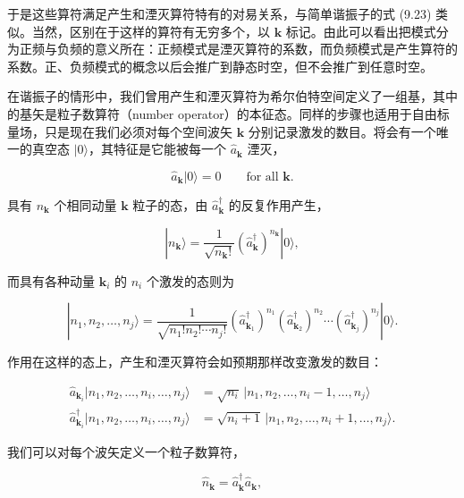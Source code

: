 于是这些算符满足产生和湮灭算符特有的对易关系，与简单谐振子的式 (9.23) 类似。当然，区别在于这样的算符有无穷多个，以 $\mathbf{k}$ 标记。由此可以看出把模式分为正频与负频的意义所在：正频模式是湮灭算符的系数，而负频模式是产生算符的系数。正、负频模式的概念以后会推广到静态时空，但不会推广到任意时空。

在谐振子的情形中，我们曾用产生和湮灭算符为希尔伯特空间定义了一组基，其中的基矢是粒子数算符（number operator）的本征态。同样的步骤也适用于自由标量场，只是现在我们必须对每个空间波矢 $\mathbf{k}$ 分别记录激发的数目。将会有一个唯一的真空态 $|0\rangle$，其特征是它能被每一个 $\hat{a}_{\mathbf{k}}$ 湮灭，

\begin{equation*}
\hat{a}_{\mathbf{k}}|0\rangle = 0 \qquad \text{for all } \mathbf{k}.
\tag{9.68}
\end{equation*}

具有 $n_{\mathbf{k}}$ 个相同动量 $\mathbf{k}$ 粒子的态，由 $\hat{a}^{\dagger}_{\mathbf{k}}$ 的反复作用产生，

\begin{equation*}
|n_{\mathbf{k}}\rangle = \frac{1}{\sqrt{n_{\mathbf{k}}!}}\left(\hat{a}^{\dagger}_{\mathbf{k}}\right)^{n_{\mathbf{k}}}|0\rangle,
\tag{9.69}
\end{equation*}

而具有各种动量 $\mathbf{k}_i$ 的 $n_i$ 个激发的态则为

\begin{equation*}
|n_1, n_2, \ldots, n_j\rangle = \frac{1}{\sqrt{n_1!n_2!\cdots n_j!}}\left(\hat{a}^{\dagger}_{\mathbf{k}_1}\right)^{n_1}\left(\hat{a}^{\dagger}_{\mathbf{k}_2}\right)^{n_2}\cdots\left(\hat{a}^{\dagger}_{\mathbf{k}_j}\right)^{n_j}|0\rangle.
\tag{9.70}
\end{equation*}

作用在这样的态上，产生和湮灭算符会如预期那样改变激发的数目：

\begin{align*}
\hat{a}_{\mathbf{k}_i}|n_1, n_2, \ldots, n_i, \ldots, n_j\rangle &= \sqrt{n_i}\,|n_1, n_2, \ldots, n_i-1, \ldots, n_j\rangle \\
\hat{a}^{\dagger}_{\mathbf{k}_i}|n_1, n_2, \ldots, n_i, \ldots, n_j\rangle &= \sqrt{n_i+1}\,|n_1, n_2, \ldots, n_i+1, \ldots, n_j\rangle.
\tag{9.71}
\end{align*}

我们可以对每个波矢定义一个粒子数算符，

\begin{equation*}
\hat{n}_{\mathbf{k}} = \hat{a}^{\dagger}_{\mathbf{k}}\hat{a}_{\mathbf{k}},
\tag{9.72}
\end{equation*}

